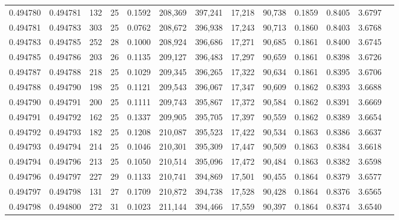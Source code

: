 \begin{tabular}{rrrrrrrrrrrrr}
0.494780 & 0.494781 & 132 &  25 &                                     0.1592 & 208,369 & 397,241 &  17,218 &  90,738 & 0.1859 & 0.8405 & 3.6797 \\
0.494781 & 0.494783 & 303 &  25 &                                     0.0762 & 208,672 & 396,938 &  17,243 &  90,713 & 0.1860 & 0.8403 & 3.6768 \\
0.494783 & 0.494785 & 252 &  28 &                                     0.1000 & 208,924 & 396,686 &  17,271 &  90,685 & 0.1861 & 0.8400 & 3.6745 \\
0.494785 & 0.494786 & 203 &  26 &                                     0.1135 & 209,127 & 396,483 &  17,297 &  90,659 & 0.1861 & 0.8398 & 3.6726 \\
0.494787 & 0.494788 & 218 &  25 &                                     0.1029 & 209,345 & 396,265 &  17,322 &  90,634 & 0.1861 & 0.8395 & 3.6706 \\
0.494788 & 0.494790 & 198 &  25 &                                     0.1121 & 209,543 & 396,067 &  17,347 &  90,609 & 0.1862 & 0.8393 & 3.6688 \\
0.494790 & 0.494791 & 200 &  25 &                                     0.1111 & 209,743 & 395,867 &  17,372 &  90,584 & 0.1862 & 0.8391 & 3.6669 \\
0.494791 & 0.494792 & 162 &  25 &                                     0.1337 & 209,905 & 395,705 &  17,397 &  90,559 & 0.1862 & 0.8389 & 3.6654 \\
0.494792 & 0.494793 & 182 &  25 &                                     0.1208 & 210,087 & 395,523 &  17,422 &  90,534 & 0.1863 & 0.8386 & 3.6637 \\
0.494793 & 0.494794 & 214 &  25 &                                     0.1046 & 210,301 & 395,309 &  17,447 &  90,509 & 0.1863 & 0.8384 & 3.6618 \\
0.494794 & 0.494796 & 213 &  25 &                                     0.1050 & 210,514 & 395,096 &  17,472 &  90,484 & 0.1863 & 0.8382 & 3.6598 \\
0.494796 & 0.494797 & 227 &  29 &                                     0.1133 & 210,741 & 394,869 &  17,501 &  90,455 & 0.1864 & 0.8379 & 3.6577 \\
0.494797 & 0.494798 & 131 &  27 &                                     0.1709 & 210,872 & 394,738 &  17,528 &  90,428 & 0.1864 & 0.8376 & 3.6565 \\
0.494798 & 0.494800 & 272 &  31 &                                     0.1023 & 211,144 & 394,466 &  17,559 &  90,397 & 0.1864 & 0.8374 & 3.6540 \\

\end{tabular}
